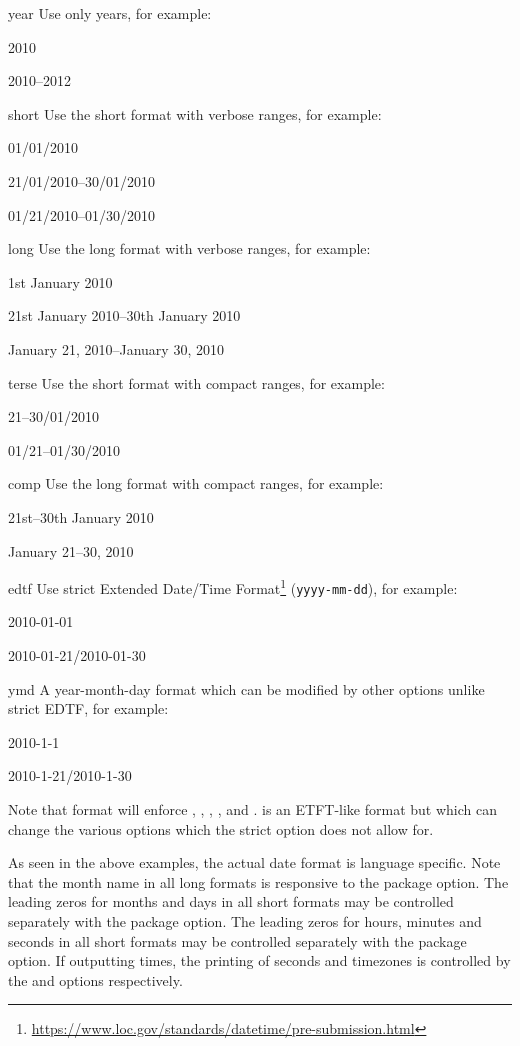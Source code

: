 \documentclass{ltxdockit}[2011/03/25]
\begin{document}
\begin{optionlist}
\begin{valuelist}
\item[year] Use only years, for example:\par
2010\par
2010--2012\par
\item[short] Use the short format with verbose ranges, for example:\par
01/01/2010\par
21/01/2010--30/01/2010\par
01/21/2010--01/30/2010
\item[long] Use the long format with verbose ranges, for example:\par
1st January 2010\par
21st January 2010--30th January 2010\par
January 21, 2010--January 30, 2010\par
\item[terse] Use the short format with compact ranges, for example:\par
21--30/01/2010\par
01/21--01/30/2010
\item[comp] Use the long format with compact ranges, for example:\par
21st--30th January 2010\par
January 21--30, 2010\par
\item[edtf] Use strict Extended Date/Time Format\footnote{\url{https://www.loc.gov/standards/datetime/pre-submission.html}} (\texttt{yyyy-mm-dd}), for example:\par
2010-01-01\par
2010-01-21/2010-01-30
\item[ymd] A year-month-day format which can be modified by other options unlike strict EDTF, for example:\par
2010-1-1\par
2010-1-21/2010-1-30
\end{valuelist}
%
Note that  format will enforce , , , ,  and .  is an ETFT-like format but which can change the various options which the strict  option does not allow for.

As seen in the above examples, the actual date format is language specific. Note that the month name in all long formats is responsive to the  package option. The leading zeros for months and days in all short formats may be controlled separately with the  package option. The leading zeros for hours, minutes and seconds in all short formats may be controlled separately with the  package option. If outputting times, the printing of seconds and timezones is controlled by the  and  options respectively.


\end{optionlist}
\end{document}

